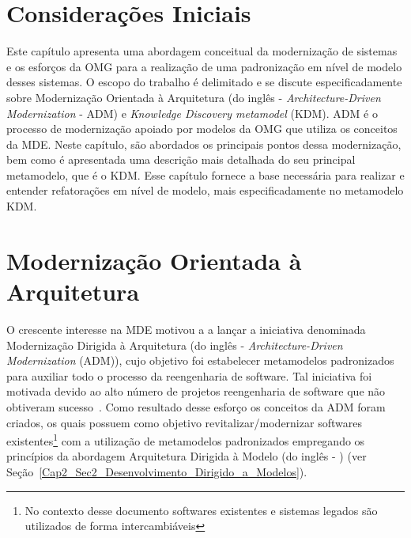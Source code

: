 
\section{Considerações Iniciais}

Este capítulo apresenta uma abordagem conceitual da modernização de sistemas e os esforços da OMG para a realização de uma padronização em nível de modelo desses sistemas. O escopo do trabalho é delimitado e se discute especificadamente sobre Modernização Orientada à Arquitetura (do inglês - \textit{Architecture-Driven Modernization} - ADM) e \textit{Knowledge Discovery metamodel} (KDM). ADM é o processo de modernização apoiado por modelos da OMG que utiliza os conceitos da MDE. Neste capítulo, são abordados os principais pontos dessa modernização, bem como é apresentada uma descrição mais detalhada do seu principal metamodelo, que é o KDM. Esse capítulo fornece a base necessária para realizar e entender refatorações em nível de modelo, mais especificadamente no metamodelo KDM.

\section{Modernização Orientada à Arquitetura} 

O crescente interesse na MDE motivou a  a lançar a iniciativa denominada Modernização Dirigida à Arquitetura (do inglês - \textit{Architecture-Driven Modernization} (ADM)), cujo objetivo foi estabelecer metamodelos padronizados para auxiliar todo o  processo da reengenharia de software. Tal iniciativa foi motivada devido ao alto número de projetos reengenharia de software que não obtiveram sucesso~\cite{Sneed_2005, Demeyer2}. Como resultado desse esforço os conceitos da ADM foram criados, os quais possuem como objetivo revitalizar/modernizar softwares existentes\footnote{No contexto desse documento softwares existentes e sistemas legados são utilizados de forma intercambiáveis} com a utilização de metamodelos padronizados empregando os princípios da abordagem Arquitetura Dirigida à Modelo (do inglês - ) (ver Seção~\ref{Cap2_Sec2_Desenvolvimento_Dirigido_a_Modelos}). %

